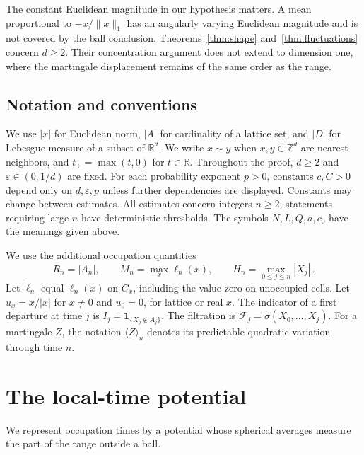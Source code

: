 \documentclass[11pt]{amsart}
\theoremstyle{plain}
\theoremstyle{definition}
\newcommand{\Z}{\mathbb Z}
\newcommand{\R}{\mathbb R}
\newcommand{\eps}{\varepsilon}
\newcommand{\ind}{\mathbf 1}
\begin{document}
The constant Euclidean magnitude in our hypothesis matters.
A mean proportional to $-x/\|x\|_1$ has an angularly varying Euclidean
magnitude and is not covered by the ball conclusion.
Theorems~\ref{thm:shape} and~\ref{thm:fluctuations} concern $d\geq2$.
Their concentration argument does not extend to dimension one, where
the martingale displacement remains of the same order as the range.

\subsection{Notation and conventions}

We use $|x|$ for Euclidean norm, $|A|$ for cardinality of a lattice set,
and $|D|$ for Lebesgue measure of a subset of $\R^d$.
We write $x\sim y$ when $x,y\in\Z^d$ are nearest neighbors, and
$t_+=\max(t,0)$ for $t\in\R$.
Throughout the proof, $d\geq2$ and $\eps\in(0,1/d)$ are fixed.
For each probability exponent $p>0$, constants $c,C>0$ depend only on
$d,\eps,p$ unless further dependencies are displayed. Constants may
change between estimates. All estimates concern integers $n\geq2$;
statements requiring large $n$ have deterministic thresholds.
The symbols $N,L,Q,a,c_0$ have the meanings given above.

We use the additional occupation quantities
\begin{equation}\label{eq:occupation}
R_n=|A_n| ,\qquad M_n=\max_x\ell_n(x) ,\qquad
H_n=\max_{0\leq j\leq n}|X_j|\, .
\end{equation}
Let $\widetilde\ell_n$ equal $\ell_n(x)$ on $C_x$, including the
value zero on unoccupied cells. Let $u_x=x/|x|$ for $x\ne0$ and
$u_0=0$, for lattice or real $x$. The indicator of a first departure
at time $j$ is $I_j=\ind_{\{X_j\notin A_j\}}$.
The filtration is $\mathcal F_j=\sigma(X_0,\ldots,X_j)$.
For a martingale $Z$, the notation $\langle Z\rangle_n$ denotes
its predictable quadratic variation through time $n$.

\section{The local-time potential}\label{sec:local}
We represent occupation times by a potential whose spherical averages
measure the part of the range outside a ball.
\end{document}
